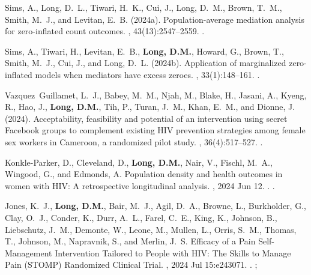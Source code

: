 \begin{thebibliography}{}
Sims, A., Long, D.~L., Tiwari, H.~K., Cui, J., Long, D.~M., Brown, T.~M.,
  Smith, M.~J., and Levitan, E.~B. (2024a).
\newblock Population-average mediation analysis for zero-inflated count
  outcomes.
, 43(13):2547--2559.
.   


Sims, A., Tiwari, H., Levitan, E.~B., \textbf{Long, D.M.}, Howard, G., Brown, T., Smith,
  M.~J., Cui, J., and Long, D.~L. (2024b).
\newblock Application of marginalized zero-inflated models when mediators have
  excess zeroes.
, 33(1):148--161.
.  



Vazquez~Guillamet, L.~J., Babey, M.~M., Njah, M., Blake, H., Jasani, A., Kyeng,
  R., Hao, J., \textbf{Long, D.M.}, Tih, P., Turan, J.~M., Khan, E.~M., and Dionne, J.
  (2024).
\newblock Acceptability, feasibility and potential of an intervention using
  secret {Facebook} groups to complement existing {HIV} prevention strategies
  among female sex workers in {Cameroon}, a randomized pilot study.
, 36(4):517--527.
.  

Konkle-Parker, D., Cleveland, D., \textbf{Long, D.M.}, Nair, V., Fischl, M.~A., Wingood, G., and Edmonds, A.
\newblock Population density and health outcomes in women with {HIV}: {A}
  retrospective longitudinal analysis.
, 2024 Jun 12. . .

Jones, K.~J., \textbf{Long, D.M.}, Bair, M.~J., Agil, D.~A., Browne, L., Burkholder, G., Clay, O.~J., Conder, K., Durr, A.~L., Farel, C.~E., King, K., Johnson, B., Liebschutz, J.~M., Demonte, W., Leone, M., Mullen, L., Orris, S.~M., Thomas, T., 
Johnson, M., Napravnik, S., and Merlin, J.~S.
\newblock Efficacy of a Pain Self-Management Intervention Tailored to People with {HIV}: The Skills to Manage Pain ({STOMP}) Randomized Clinical Trial.
, 2024 Jul 15:e243071. . ; 


\end{thebibliography}
